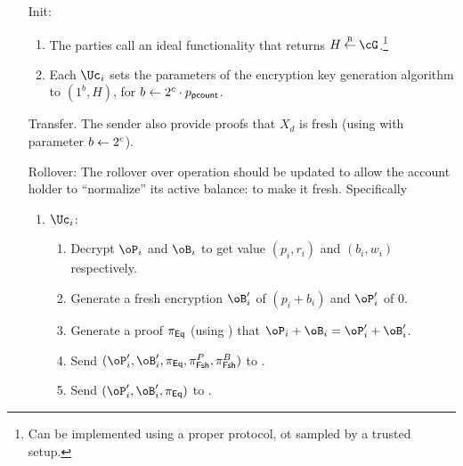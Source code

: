 \begin{enumerate}
	
	\item[Init:] 
	\begin{enumerate}
		\item The parties  call an ideal functionality that returns $H \getsr \cG$.\footnote{Can be implemented using a proper protocol, ot sampled by a trusted  setup.}
		  
		\item 	Each $\Uc_i$ sets the parameters of the encryption key generation algorithm to $(1^b,H)$, for  $b \leftarrow 2^{c}\cdot p_{\mathsf{pcount}}$.

	\end{enumerate}
 
	\item[Transfer.]  The sender also provide proofs that $X_d$ is fresh (\ie using \pZK{\rtFsh} with parameter $b\leftarrow 2^c$).
	
	
	
	\item[Rollover:] The rollover over operation should be updated to allow the account holder to ``normalize''  its active balance: to make it fresh. Specifically
	
	\begin{enumerate}
		\item $\Uc_i$:
		
		\begin{enumerate}
			\item Decrypt $\oP_i$ and $\oB_i$ to get value $(p_i,r_i)$ and $(b_i,w_i)$ respectively.
			
			
			\item Generate a fresh  encryption $\oB_i'$ of $(p_i +b_i )$ and $\oP_i'$ of $0$.
			
			\item Generate a proof $\pi_{\sf Eq}$ (\ie using \pZK{\rEq})   that $\oP_i+\oB_i = \oP_i'+ \oB_i'$.
			
			
			
			\item Send $(\oP_i',\oB_i',\pi_\Eqs,\pi^P_\FshS,\pi^B_\FshS)$ to \Cc.
			\item Send $(\oP_i',\oB_i',\pi_\Eqs)$ to \Cc.
		
		
		\end{enumerate}
		

\end{enumerate}
\end{enumerate}
